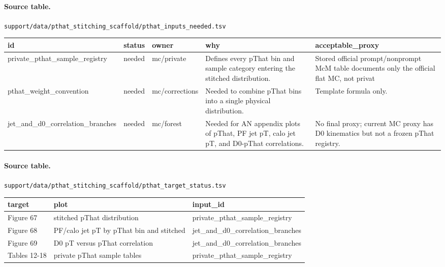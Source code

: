 \documentclass[11pt]{article}
\begin{document}
\paragraph{Source table.} \texttt{support/data/pthat\_stitching\_scaffold/pthat\_inputs\_needed.tsv}
\begin{center}\scriptsize
\begin{tabular}{|l|l|l|l|l|}
\hline
id & status & owner & why & acceptable\_proxy \\ \hline
private\_pthat\_sample\_registry & needed & mc/private & Defines every pThat bin and sample category entering the stitched distribution. & Stored official prompt/nonprompt McM table documents only the official flat MC, not privat \\ \hline
pthat\_weight\_convention & needed & mc/corrections & Needed to combine pThat bins into a single physical distribution. & Template formula only. \\ \hline
jet\_and\_d0\_correlation\_branches & needed & mc/forest & Needed for AN appendix plots of pThat, PF jet pT, calo jet pT, and D0-pThat correlations. & No final proxy; current MC proxy has D0 kinematics but not a frozen pThat registry. \\ \hline
\end{tabular}
\end{center}
\paragraph{Source table.} \texttt{support/data/pthat\_stitching\_scaffold/pthat\_target\_status.tsv}
\begin{center}\scriptsize
\begin{tabular}{|l|l|l|}
\hline
target & plot & input\_id \\ \hline
Figure 67 & stitched pThat distribution & private\_pthat\_sample\_registry \\ \hline
Figure 68 & PF/calo jet pT by pThat bin and stitched & jet\_and\_d0\_correlation\_branches \\ \hline
Figure 69 & D0 pT versus pThat correlation & jet\_and\_d0\_correlation\_branches \\ \hline
Tables 12-18 & private pThat sample tables & private\_pthat\_sample\_registry \\ \hline
\end{tabular}
\end{center}
\end{document}
